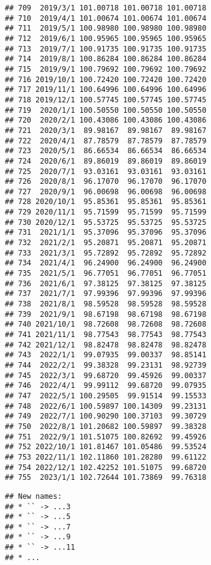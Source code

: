\documentclass[
]{article}
\begin{document}
\begin{verbatim}
## 709  2019/3/1 101.00718 101.00718 101.00718
## 710  2019/4/1 101.00674 101.00674 101.00674
## 711  2019/5/1 100.98980 100.98980 100.98980
## 712  2019/6/1 100.95965 100.95965 100.95965
## 713  2019/7/1 100.91735 100.91735 100.91735
## 714  2019/8/1 100.86284 100.86284 100.86284
## 715  2019/9/1 100.79692 100.79692 100.79692
## 716 2019/10/1 100.72420 100.72420 100.72420
## 717 2019/11/1 100.64996 100.64996 100.64996
## 718 2019/12/1 100.57745 100.57745 100.57745
## 719  2020/1/1 100.50550 100.50550 100.50550
## 720  2020/2/1 100.43086 100.43086 100.43086
## 721  2020/3/1  89.98167  89.98167  89.98167
## 722  2020/4/1  87.78579  87.78579  87.78579
## 723  2020/5/1  86.66534  86.66534  86.66534
## 724  2020/6/1  89.86019  89.86019  89.86019
## 725  2020/7/1  93.03161  93.03161  93.03161
## 726  2020/8/1  96.17070  96.17070  96.17070
## 727  2020/9/1  96.00698  96.00698  96.00698
## 728 2020/10/1  95.85361  95.85361  95.85361
## 729 2020/11/1  95.71599  95.71599  95.71599
## 730 2020/12/1  95.53725  95.53725  95.53725
## 731  2021/1/1  95.37096  95.37096  95.37096
## 732  2021/2/1  95.20871  95.20871  95.20871
## 733  2021/3/1  95.72892  95.72892  95.72892
## 734  2021/4/1  96.24900  96.24900  96.24900
## 735  2021/5/1  96.77051  96.77051  96.77051
## 736  2021/6/1  97.38125  97.38125  97.38125
## 737  2021/7/1  97.99396  97.99396  97.99396
## 738  2021/8/1  98.59528  98.59528  98.59528
## 739  2021/9/1  98.67198  98.67198  98.67198
## 740 2021/10/1  98.72608  98.72608  98.72608
## 741 2021/11/1  98.77543  98.77543  98.77543
## 742 2021/12/1  98.82478  98.82478  98.82478
## 743  2022/1/1  99.07935  99.00337  98.85141
## 744  2022/2/1  99.38328  99.23131  98.92739
## 745  2022/3/1  99.68720  99.45926  99.00337
## 746  2022/4/1  99.99112  99.68720  99.07935
## 747  2022/5/1 100.29505  99.91514  99.15533
## 748  2022/6/1 100.59897 100.14309  99.23131
## 749  2022/7/1 100.90290 100.37103  99.30729
## 750  2022/8/1 101.20682 100.59897  99.38328
## 751  2022/9/1 101.51075 100.82692  99.45926
## 752 2022/10/1 101.81467 101.05486  99.53524
## 753 2022/11/1 102.11860 101.28280  99.61122
## 754 2022/12/1 102.42252 101.51075  99.68720
## 755  2023/1/1 102.72644 101.73869  99.76318
\end{verbatim}

\begin{verbatim}
## New names:
## * `` -> ...3
## * `` -> ...5
## * `` -> ...7
## * `` -> ...9
## * `` -> ...11
## * ...
\end{verbatim}
\end{document}
